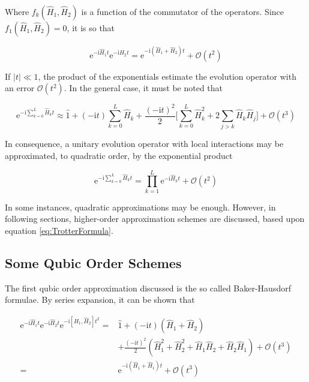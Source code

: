   Where $f_k(\hat{H}_1,\hat{H}_2)$ is a function of the commutator of the operators. Since $f_1(\hat{H}_1,\hat{H}_2) = 0$, it is so that

  \begin{equation}
    \mathrm{e}^{-\mathrm{i}\hat{H}_1 t}\mathrm{e}^{-\mathrm{i}\hat{H}_2 t} = \mathrm{e}^{-\mathrm{i}(\hat{H}_1 + \hat{H}_2) t} + \mathcal{O}(t^2)
    \label{eq:O2Approx}
  \end{equation}

  If $|t| \ll 1$, the product of the exponentials estimate the evolution operator with an error $\mathcal{O}(t^2)$. In the general case, it must be noted that

  \begin{equation}
    \mathrm{e}^{-\mathrm{i}\sum_{k = 0}^L \hat{H}_k t} \approx \hat{1} + (-\mathrm{i}t)\sum_{k = 0}^L \hat{H}_k + \frac{(-\mathrm{i}t)^2}{2} \Bigg[\sum_{k = 0}^L \hat{H}_k^2 + 2 \sum_{j > k}\hat{H}_k \hat{H}_j\Bigg] + \mathcal{O}(t^3)
    \label{eq:TrotterFormula}
  \end{equation}

  In consequence, a unitary evolution operator with local interactions may be approximated, to quadratic order, by the exponential product

  \begin{equation}
    \mathrm{e}^{-\mathrm{i}\sum_{k = 0}^L \hat{H}_k t} = \prod_{k = 1}^{L} \mathrm{e}^{-\mathrm{i}\hat{H}_kt} + \mathcal{O}(t^2)
    \label{eq:2ndOrderTrotter}
  \end{equation}

  In some instances, quadratic approximations may be enough. However, in following sections, higher-order approximation schemes are discussed, based upon equation \ref{eq:TrotterFormula}.

  \subsection{Some Qubic Order Schemes}

  The first qubic order approximation discussed is the so called Baker-Hausdorf formulae. By series expansion, it can be shown that

  \begin{align*}
    \mathrm{e}^{-\mathrm{i}\hat{H}_1t}\mathrm{e}^{-\mathrm{i}\hat{H}_2t}\mathrm{e}^{-\mathrm{i}[\hat{H}_1,\hat{H}_2]t^2} = & \hat{1} + (-\mathrm{i}t) (\hat{H}_1 + \hat{H}_2) \\
    & + \frac{(-\mathrm{i}t)^2}{2}(\hat{H}_1^2 + \hat{H}_2^2 + \hat{H}_1\hat{H}_2 + \hat{H}_2\hat{H}_1) + \mathcal{O}(t^3) \\
    = & \mathrm{e}^{-\mathrm{i}(\hat{H}_1 + \hat{H}_1)t} + \mathcal{O}(t^3)
    \label{eq:Hausdorf1}
  \end{align*}

